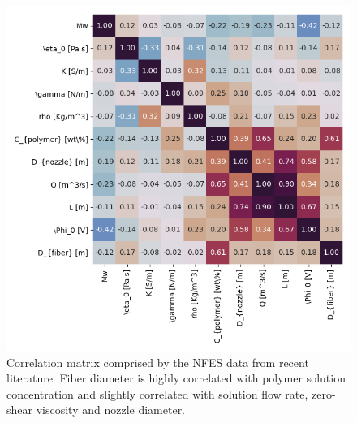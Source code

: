 \begin{figure}[!th]
\centering
\includegraphics[width=\textwidth]{./Figures/plt_corMat.png}
\decoRule
\caption[NFES correlation matrix of process parameters and fiber morphology]{{Correlation matrix comprised by the NFES data from recent literature. 
\cite{
  Yang2019,Fattahi2017,Shin2019,Wang2015,Parajuli2016,Zheng2010,Fuh2011,Dalton2015,
  Ru2014,Xue2014,Wang2017,Xu2014,Liu2013,Pan2014,Canton2014,Chakraborty2009,Gupta2007,
  He2018,Zhou2011,Chen2013,Williams2018,Choi2017,Pan2019,Lei2015,Lim2019,Park2020,
  Fuh2012,Flores2017,Chang2010,Xu2019,Zhang2019,Shin2018,Fuh2015,Nagle2019,Zheng2012,
  Kameoka2003a,Liu2014,E.King2019,Hochleitner2017,Madou2011,Jiang2018,Husain2016,
  ElectrospinTech2015,Brown2011,Kolan2018,Chang2011,Beachley2011,Camillo2013,Kameoka2003,
  Bu2012,Lee2012,Huang2015,Coppola2020,CisquellaSerra2019,Ruggieri2013,Hochleitner2014,
  Zhu2016,Brown2014,Chang2008,Sonntag2020,Kim2018,Deng2020,Han2019,George2020,Sun2006a,
  Pan2015,Shen2016,Strauss2019,Fuh2013,Sarkar2007,You2017,Wang2018a,Zheng2014,Song2015,
  GaofengZheng2010,Liu2015a,Min2013,Luo2016,Yousefi2019,Cardenas2017,Coppola2014} Fiber diameter is highly correlated with polymer solution concentration and slightly correlated with solution flow rate, zero-shear viscosity and nozzle diameter.}}
\label{fig:plt_corMat}
\end{figure}

